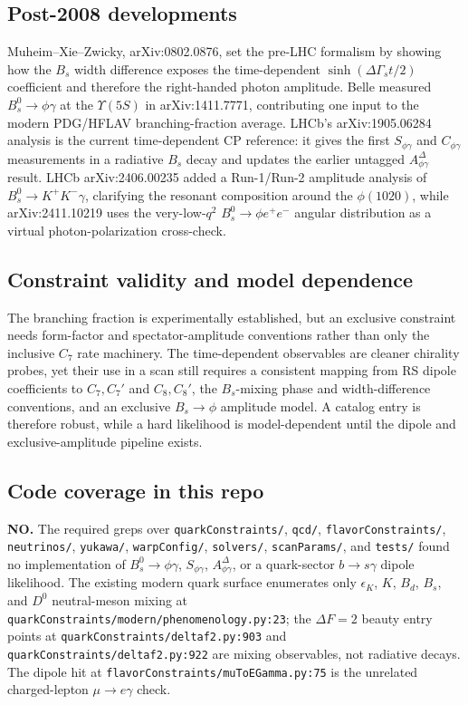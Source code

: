 \subsection*{Post-2008 developments}
Muheim--Xie--Zwicky, arXiv:0802.0876, set the pre-LHC formalism by showing how
the \(B_s\) width difference exposes the time-dependent
\(\sinh(\Delta\Gamma_s t/2)\) coefficient and therefore the right-handed photon
amplitude.  Belle measured \(B_s^0\to\phi\gamma\) at the \(\Upsilon(5S)\) in
arXiv:1411.7771, contributing one input to the modern PDG/HFLAV
branching-fraction average.  LHCb's arXiv:1905.06284 analysis is the current
time-dependent CP reference: it gives the first \(S_{\phi\gamma}\) and
\(C_{\phi\gamma}\) measurements in a radiative \(B_s\) decay and updates the
earlier untagged \(A^\Delta_{\phi\gamma}\) result.  LHCb arXiv:2406.00235 added
a Run-1/Run-2 amplitude analysis of \(B_s^0\to K^+K^-\gamma\), clarifying the
resonant composition around the \(\phi(1020)\), while arXiv:2411.10219 uses the
very-low-\(q^2\) \(B_s^0\to\phi e^+e^-\) angular distribution as a virtual
photon-polarization cross-check.

\subsection*{Constraint validity and model dependence}
The branching fraction is experimentally established, but an exclusive
constraint needs form-factor and spectator-amplitude conventions rather than
only the inclusive \(C_7\) rate machinery.  The time-dependent observables are
cleaner chirality probes, yet their use in a scan still requires a consistent
mapping from RS dipole coefficients to \(C_7,C_7'\) and \(C_8,C_8'\), the
\(B_s\)-mixing phase and width-difference conventions, and an exclusive
\(B_s\to\phi\) amplitude model.  A catalog entry is therefore robust, while a
hard likelihood is model-dependent until the dipole and exclusive-amplitude
pipeline exists.

\subsection*{Code coverage in this repo}
\textbf{NO.}  The required greps over \texttt{quarkConstraints/},
\texttt{qcd/}, \texttt{flavorConstraints/}, \texttt{neutrinos/},
\texttt{yukawa/}, \texttt{warpConfig/}, \texttt{solvers/},
\texttt{scanParams/}, and \texttt{tests/} found no implementation of
\(B_s^0\to\phi\gamma\), \(S_{\phi\gamma}\), \(A^\Delta_{\phi\gamma}\), or a
quark-sector \(b\to s\gamma\) dipole likelihood.  The existing modern quark
surface enumerates only \(\epsilon_K\), \(K\), \(B_d\), \(B_s\), and \(D^0\)
neutral-meson mixing at \texttt{quarkConstraints/modern/phenomenology.py:23};
the \(\Delta F=2\) beauty entry points at
\texttt{quarkConstraints/deltaf2.py:903} and
\texttt{quarkConstraints/deltaf2.py:922} are mixing observables, not radiative
decays.  The dipole hit at \texttt{flavorConstraints/muToEGamma.py:75} is the
unrelated charged-lepton \(\mu\to e\gamma\) check.

